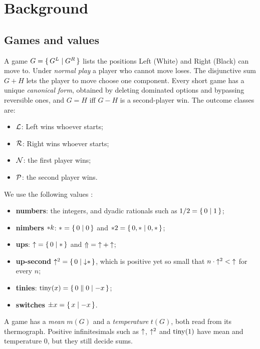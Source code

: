 \section{Background}\label{sec:background}

\subsection{Games and values}
A game $G=\{\,G^L \mid G^R\,\}$ lists the positions Left (White) and Right (Black) can move to. Under
\emph{normal play} a player who cannot move loses. The disjunctive sum $G+H$ lets the player to move choose one
component. Every short game has a unique \emph{canonical form}, obtained by deleting dominated options and
bypassing reversible ones, and $G=H$ iff $G-H$ is a second-player win. The outcome classes are:
\begin{itemize}
\item $\mathcal{L}$: Left wins whoever starts;
\item $\mathcal{R}$: Right wins whoever starts;
\item $\mathcal{N}$: the first player wins;
\item $\mathcal{P}$: the second player wins.
\end{itemize}
We use the following values \citep{WinningWays,Siegel2013}:
\begin{itemize}
\item \textbf{numbers}: the integers, and dyadic rationals such as $1/2=\{\,0 \mid 1\,\}$;
\item \textbf{nimbers} $\mathord{\ast k}$: $\mathord{\ast}=\{\,0 \mid 0\,\}$ and $\mathord{\ast 2}=\{\,0,\mathord{\ast} \mid 0,\mathord{\ast}\,\}$;
\item \textbf{ups}: $\mathord{\uparrow}=\{\,0 \mid \mathord{\ast}\,\}$ and $\mathord{\Uparrow}=\mathord{\uparrow}+\mathord{\uparrow}$;
\item \textbf{up-second} $\mathord{\uparrow^{2}}=\{\,0 \mid \mathord{\downarrow}\mathord{\ast}\,\}$, which is positive yet so small that $n\cdot\mathord{\uparrow^{2}}<\mathord{\uparrow}$ for every $n$;
\item \textbf{tinies}: $\operatorname{tiny}(x)=\{\,0 \parallel 0\mid -x\,\}$;
\item \textbf{switches} $\pm x=\{\,x \mid -x\,\}$.
\end{itemize}
A game has a \emph{mean} $m(G)$ and a \emph{temperature} $t(G)$, both read from its thermograph. Positive
infinitesimals such as $\mathord{\uparrow}$, $\mathord{\uparrow^{2}}$ and $\operatorname{tiny}(1)$ have mean and temperature $0$, but they still decide sums.

